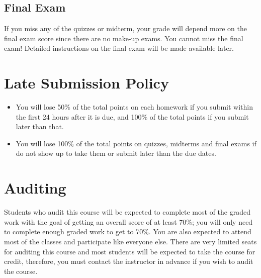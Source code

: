 \documentclass[11pt, a4paper]{article}
\begin{document}
\subsection{Final Exam}
If you miss any of the quizzes or midterm, your grade will depend more on the final exam score since there are no make-up exams. You cannot miss the final exam! Detailed instructions on the final exam will be made available later.


\section{Late Submission Policy} 
\begin{itemize}
	\item  You will lose 50\% of the total points on each homework if you submit within the first 24 hours after it is due, and 100\% of the total points if you submit later than that.
	\item You will lose 100\% of the total points on quizzes, midterms and final exams if do not show up to take them or submit later than the due dates.
\end{itemize}


\section{Auditing}
Students who audit this course will be expected to complete most of the graded work with the goal of getting an overall score of at least 70\%; you will only need to complete enough graded work to get to 70\%. You are also expected to attend most of the classes and participate like everyone else. There are very limited seats for auditing this course and most students will be expected to take the course for credit, therefore, you must contact the instructor in advance if you wish to audit the course.
\end{document}
